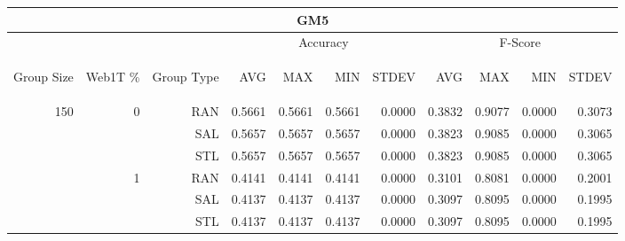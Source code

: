 \begin{center}
\begin{table}[htbp]
\begin{tabular}{ | r | r | r | r | r | r | r | r | r | r | r |}
\hline
\multicolumn{11}{|c|}{GM5}\\
\hline
 & & & \multicolumn{4}{|c|}{Accuracy} & \multicolumn{4}{|c|}{F-Score}\\ \cline{4-11}
\begin{sideways}Group Size\end{sideways} & \begin{sideways}Web1T \%\end{sideways} & \begin{sideways}Group Type\end{sideways} & \begin{sideways}AVG\end{sideways} & \begin{sideways}MAX\end{sideways} & \begin{sideways}MIN\end{sideways} & \begin{sideways}STDEV\end{sideways} & \begin{sideways}AVG\end{sideways} & \begin{sideways}MAX\end{sideways} & \begin{sideways}MIN\end{sideways} & \begin{sideways}STDEV\end{sideways}\\
\hline
\multirow{18}{*}{150}
 & \multirow{3}{*}{0} & RAN & 0.5661 & 0.5661 & 0.5661 & 0.0000 & 0.3832 & 0.9077 & 0.0000 & 0.3073\\ \cline{3-11}
 &   & SAL & 0.5657 & 0.5657 & 0.5657 & 0.0000 & 0.3823 & 0.9085 & 0.0000 & 0.3065\\ \cline{3-11}
 &   & STL & 0.5657 & 0.5657 & 0.5657 & 0.0000 & 0.3823 & 0.9085 & 0.0000 & 0.3065\\ \cline{2-11}
 & \multirow{3}{*}{1} & RAN & 0.4141 & 0.4141 & 0.4141 & 0.0000 & 0.3101 & 0.8081 & 0.0000 & 0.2001\\ \cline{3-11}
 &   & SAL & 0.4137 & 0.4137 & 0.4137 & 0.0000 & 0.3097 & 0.8095 & 0.0000 & 0.1995\\ \cline{3-11}
 &   & STL & 0.4137 & 0.4137 & 0.4137 & 0.0000 & 0.3097 & 0.8095 & 0.0000 & 0.1995\\ \cline{2-11}

\end{tabular}
\end{table}
\end{center}
